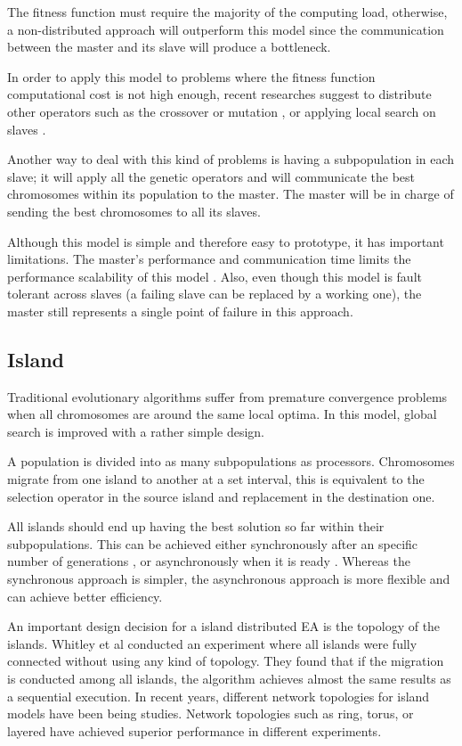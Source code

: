 The fitness function must require the majority of the computing load, otherwise, a non-distributed approach will outperform this model since the communication between the master and its slave will produce a bottleneck. 

In order to apply this model to problems where the fitness function computational cost is not high enough, recent researches suggest to distribute other operators such as the crossover or mutation \cite{ismail}, or applying local search on slaves \cite{zhang2}. 

Another way to deal with this kind of problems is having a subpopulation in each slave; it will apply all the genetic operators and will communicate the best chromosomes within its population to the master. The master will be in charge of sending the best chromosomes to all its slaves.\cite{zhang1}

Although this model is simple and therefore easy to prototype, it has important limitations. The master's performance and communication time limits the performance scalability of this model \cite{erick}. Also, even though this model is fault tolerant across slaves (a failing slave can be replaced by a working one), the master still represents a single point of failure in this approach.

\subsection{Island}

Traditional evolutionary algorithms suffer from premature convergence problems when all chromosomes are around the same local optima. In this model, global search is improved with a rather simple design.

A population is divided into as many subpopulations as processors. Chromosomes migrate from one island to another at a set interval, this is equivalent to the selection operator in the source island and replacement in the destination one.

All islands should end up having the best solution so far within their subpopulations. This can be achieved either synchronously after an specific number of generations \cite{89}, or asynchronously when it is ready \cite{30}. Whereas the synchronous approach is simpler, the asynchronous approach is more flexible and can achieve better efficiency.

An important design decision for a island distributed EA is the topology of the islands. Whitley et al \cite{140} conducted an experiment where all islands were fully connected without using any kind of topology. They found that if the migration is conducted among all islands, the algorithm achieves almost the same results as a sequential execution. In recent years, different network topologies for island models have been being studies. Network topologies such as ring, torus, or layered have achieved superior performance in different experiments. \cite{62}

